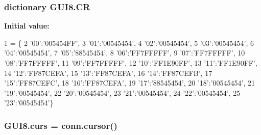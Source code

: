 \subsubsection[{\texorpdfstring{CR}{CR}}]{\setlength{\rightskip}{0pt plus 5cm}dictionary G\+U\+I8.\+CR}\hypertarget{namespaceGUI8_ac8f0ade69b245f322c069be72b159d1b}{}\label{namespaceGUI8_ac8f0ade69b245f322c069be72b159d1b}
{\bfseries Initial value\+:}
\begin{DoxyCode}
1 = \{
2 \textcolor{stringliteral}{'00'}:\textcolor{stringliteral}{'005454FF'},
3 \textcolor{stringliteral}{'01'}:\textcolor{stringliteral}{'00545454'},
4 \textcolor{stringliteral}{'02'}:\textcolor{stringliteral}{'00545454'},
5 \textcolor{stringliteral}{'03'}:\textcolor{stringliteral}{'00545454'},
6 \textcolor{stringliteral}{'04'}:\textcolor{stringliteral}{'00545454'},
7 \textcolor{stringliteral}{'05'}:\textcolor{stringliteral}{'88545454'},
8 \textcolor{stringliteral}{'06'}:\textcolor{stringliteral}{'FF7FFFFF'},
9 \textcolor{stringliteral}{'07'}:\textcolor{stringliteral}{'FF7FFFFF'},
10 \textcolor{stringliteral}{'08'}:\textcolor{stringliteral}{'FF7FFFFF'},
11 \textcolor{stringliteral}{'09'}:\textcolor{stringliteral}{'FF7FFFFF'},
12 \textcolor{stringliteral}{'10'}:\textcolor{stringliteral}{'FF1E90FF'},
13 \textcolor{stringliteral}{'11'}:\textcolor{stringliteral}{'FF1E90FF'},
14 \textcolor{stringliteral}{'12'}:\textcolor{stringliteral}{'FF87CEFA'},
15 \textcolor{stringliteral}{'13'}:\textcolor{stringliteral}{'FF87CEFA'},
16 \textcolor{stringliteral}{'14'}:\textcolor{stringliteral}{'FF87CEFB'},
17 \textcolor{stringliteral}{'15'}:\textcolor{stringliteral}{'FF87CEFC'},
18 \textcolor{stringliteral}{'16'}:\textcolor{stringliteral}{'FF87CEFA'},
19 \textcolor{stringliteral}{'17'}:\textcolor{stringliteral}{'88545454'},
20 \textcolor{stringliteral}{'18'}:\textcolor{stringliteral}{'00545454'},
21 \textcolor{stringliteral}{'19'}:\textcolor{stringliteral}{'00545454'},
22 \textcolor{stringliteral}{'20'}:\textcolor{stringliteral}{'00545454'},
23 \textcolor{stringliteral}{'21'}:\textcolor{stringliteral}{'00545454'},
24 \textcolor{stringliteral}{'22'}:\textcolor{stringliteral}{'00545454'},
25 \textcolor{stringliteral}{'23'}:\textcolor{stringliteral}{'00545454'}\}
\end{DoxyCode}
\subsubsection[{\texorpdfstring{curs}{curs}}]{\setlength{\rightskip}{0pt plus 5cm}G\+U\+I8.\+curs = conn.\+cursor()}\hypertarget{namespaceGUI8_a9d14617d09e50247fc7d7b65ea35c514}{}\label{namespaceGUI8_a9d14617d09e50247fc7d7b65ea35c514}
